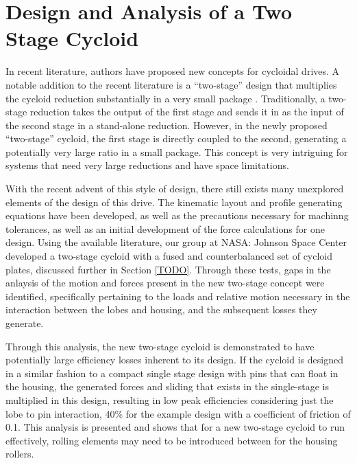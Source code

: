 
\chapter{Design and Analysis of a Two Stage Cycloid}\label{ch:dual}

In recent literature, authors have proposed new concepts for cycloidal drives. A notable addition to the recent literature is a ``two-stage'' design that multiplies the cycloid reduction substantially in a very small package \cite{ref:new_two_stage}. Traditionally, a two-stage reduction takes the output of the first stage and sends it in as the input of the second stage in a stand-alone reduction. However, in the newly proposed ``two-stage'' cycloid, the first stage is directly coupled to the second, generating a potentially very large ratio in a small package. This concept is very intriguing for systems that need very large reductions and have space limitations. 

With the recent advent of this style of design, there still exists many unexplored elements of the design of this drive. The kinematic layout and profile generating equations have been developed, as well as the precautions necessary for machinng tolerances, as well as an initial development of the force calculations for one design. Using the available literature, our group at NASA: Johnson Space Center developed a two-stage cycloid with a fused and counterbalanced set of cycloid plates, discussed further in Section \ref{TODO}. Through these tests, gaps in the anlaysis of the motion and forces present in the new two-stage concept were identified, specifically pertaining to the loads and relative motion necessary in the interaction between the lobes and housing, and the subsequent losses they generate. 

Through this analysis, the new two-stage cycloid is demonstrated to have potentially large efficiency losses inherent to its design. If the cycloid is designed in a similar fashion to a compact single stage design with pins that can float in the housing, the generated forces and sliding that exists in the single-stage is multiplied in this design, resulting in low peak efficiencies considering just the lobe to pin interaction, 40\% for the example design with a coefficient of friction of 0.1. This analysis is presented and shows that for a new two-stage cycloid to run effectively, rolling elements may need to be introduced between for the housing rollers. 

